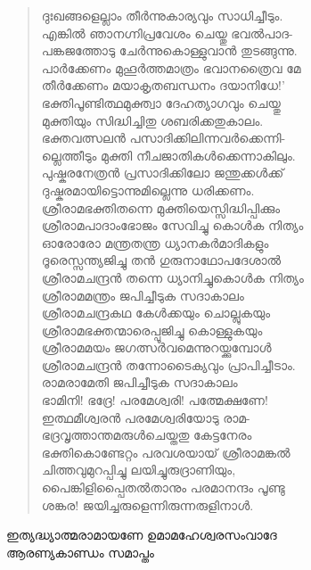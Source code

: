 \begin{verse}
ദുഃഖങ്ങളെല്ലാം തീര്‍ന്നുകാര്യവും സാധിച്ചീടും.\\
എങ്കില്‍ ഞാനഗ്നിപ്രവേശം ചെയ്തു ഭവല്‍പാദ-\\
പങ്കജത്തോടു ചേര്‍ന്നുകൊള്ളുവാന്‍ തുടങ്ങുന്നു.\\
പാര്‍ക്കേണം മുഹൂര്‍ത്തമാത്രം ഭവാനത്രൈവ മേ\\
തീര്‍ക്കേണം മയാകൃതബന്ധനം ദയാനിധേ!’\\
ഭക്തിപൂണ്ടിത്ഥമുക്ത്വാ ദേഹത്യാഗവും ചെയ്തു\\
മുക്തിയും സിദ്ധിച്ചിതു ശബരിക്കതുകാലം.\\
ഭക്തവത്സലന്‍ പസാദിക്കിലിന്നവര്‍ക്കെന്നി-\\
ല്ലെത്തീടും മുക്തി നീചജാതികള്‍ക്കെന്നാകിലും.\\
പുഷ്കരനേത്രന്‍ പ്രസാദിക്കിലോ ജന്തുക്കള്‍ക്ക്‍\\
ദുഷ്കരമായിട്ടൊന്നുമില്ലെന്നു ധരിക്കണം.\\
ശ്രീരാമഭക്തിതന്നെ മുക്തിയെസ്സിദ്ധിപ്പിക്കും\\
ശ്രീരാമപാദാംഭോജം സേവിച്ചു കൊള്‍ക നിത്യം\\
ഓരോരോ മന്ത്രതന്ത്ര ധ്യാനകര്‍മാദികളും\\
ദൂരെസ്സന്ത്യജിച്ചു തന്‍ ഗുരുനാഥോപദേശാല്‍\\
ശ്രീരാമചന്ദ്രന്‍ തന്നെ ധ്യാനിച്ചുകൊള്‍ക നിത്യം\\
ശ്രീരാമമന്ത്രം ജപിച്ചീടുക സദാകാലം\\
ശ്രീരാമചന്ദ്രകഥ കേള്‍ക്കയും ചൊല്ലുകയും\\
ശ്രീരാമഭക്തന്മാരെപ്പൂജിച്ചു കൊള്ളുകയും\\
ശ്രീരാമമയം ജഗത്സര്‍വമെന്നുറയ്ക്കുമ്പോള്‍\\
ശ്രീരാമചന്ദ്രന്‍ തന്നോടൈക്യവും പ്രാപിച്ചീടാം.\\
രാമരാമേതി ജപിച്ചീടുക സദാകാലം\\
ഭാമിനി! ഭദ്രേ! പരമേശ്വരി! പത്മേക്ഷണേ!\\
ഇത്ഥമീശ്വരന്‍ പരമേശ്വരിയോടു രാമ-\\
ഭദ്രവൃത്താന്തമരുള്‍ചെയ്തതു കേട്ടനേരം\\
ഭക്തികൊണ്ടേറ്റം പരവശയായ് ശ്രീരാമങ്കല്‍\\
ചിത്തവുമുറപ്പിച്ചു ലയിച്ചുരുദ്രാണിയും,\\
പൈങ്കിളിപ്പൈതല്‍താനും പരമാനന്ദം പൂണ്ടു\\
ശങ്കര! ജയിച്ചരുളെന്നിരുന്നരുളിനാള്‍.
\end{verse}

\begin{center}
ഇത്യദ്ധ്യാത്മരാമായണേ ഉമാമഹേശ്വരസംവാദേ\\
ആരണ്യകാണ്ഡം സമാപ്തം
\end{center}
